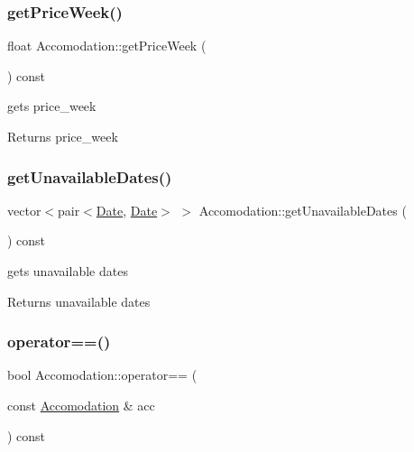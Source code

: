 \subsubsection{\texorpdfstring{get\+Price\+Week()}{getPriceWeek()}}
{\footnotesize\ttfamily float Accomodation\+::get\+Price\+Week (\begin{DoxyParamCaption}{ }\end{DoxyParamCaption}) const\hspace{0.3cm}{\ttfamily [inline]}}



gets price\+\_\+week 

\begin{DoxyReturn}{Returns}
price\+\_\+week 
\end{DoxyReturn}
\hypertarget{class_accomodation_a63c58fd6e01101095522573579490e7b}{}\label{class_accomodation_a63c58fd6e01101095522573579490e7b} 
\subsubsection{\texorpdfstring{get\+Unavailable\+Dates()}{getUnavailableDates()}}
{\footnotesize\ttfamily vector$<$pair$<$\hyperlink{class_date}{Date}, \hyperlink{class_date}{Date}$>$ $>$ Accomodation\+::get\+Unavailable\+Dates (\begin{DoxyParamCaption}{ }\end{DoxyParamCaption}) const\hspace{0.3cm}{\ttfamily [inline]}}



gets unavailable dates 

\begin{DoxyReturn}{Returns}
unavailable dates 
\end{DoxyReturn}
\hypertarget{class_accomodation_ae42299afc3f8bf211fe69821f876d48a}{}\label{class_accomodation_ae42299afc3f8bf211fe69821f876d48a} 
\subsubsection{\texorpdfstring{operator==()}{operator==()}}
{\footnotesize\ttfamily bool Accomodation\+::operator== (\begin{DoxyParamCaption}\item[{const \hyperlink{class_accomodation}{Accomodation} \&}]{acc }\end{DoxyParamCaption}) const}



